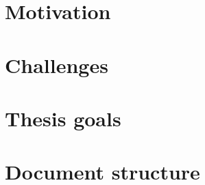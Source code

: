 \begin{introduction}
    \section{Motivation}
    \section{Challenges}
    \section{Thesis goals}
    \section{Document structure}
\end{introduction}